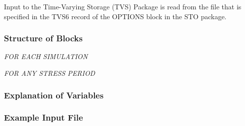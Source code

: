 Input to the Time-Varying Storage (TVS) Package is read from the file that is specified in the TVS6 record of the OPTIONS block in the STO package.

\vspace{5mm}
\subsubsection{Structure of Blocks}
\vspace{5mm}

\noindent \textit{FOR EACH SIMULATION}

\vspace{5mm}
\noindent \textit{FOR ANY STRESS PERIOD}


\vspace{5mm}
\subsubsection{Explanation of Variables}
\begin{description}

\end{description}

\vspace{5mm}
\subsubsection{Example Input File}

